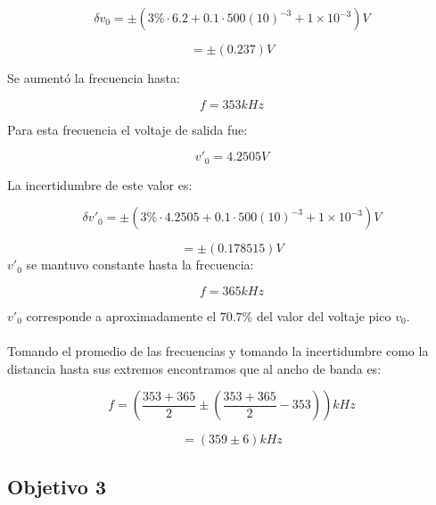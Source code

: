 \documentclass[DIV=calc, paper=a4, fontsize=11pt]{scrartcl}
\begin{document}
\begin{multicols}{2}
\begin{equation*}
    \delta v_{0}=\pm(3\%\cdot 6.2 + 0.1 \cdot 500 (10)^{-3} + 1\times10^{-3} ) V
\end{equation*}

\begin{equation*}
    =\pm( 0.237) V
\end{equation*}

Se aumentó la frecuencia hasta:

\begin{equation*}
    f= 353 kHz
\end{equation*}

Para esta frecuencia el voltaje de salida fue:

\begin{equation*}
    v'_{0} = 4.2505 V
\end{equation*}

La incertidumbre de este valor es:

\begin{equation*}
    \delta v'_{0}=\pm(3\%\cdot 4.2505 + 0.1 \cdot 500 (10)^{-3} + 1\times10^{-3} ) V
\end{equation*}

\begin{equation*}
    =\pm( 0.178515) V
\end{equation*}
$v'_{0}$ se mantuvo constante hasta la frecuencia:

\begin{equation*}
    f= 365 kHz
\end{equation*}

$v'_{0}$ corresponde a aproximadamente el $70.7\%$ del valor del voltaje pico $v_{0}$.
\\\\
Tomando el promedio de las frecuencias y tomando la incertidumbre como la distancia hasta sus extremos encontramos que al ancho de banda es:

\begin{equation*}
    f= \left(\frac{353+365}{2}\pm \left(\frac{353+365}{2}-353\right) \right) kHz
\end{equation*}

\begin{equation*}
    = (359\pm6) kHz
\end{equation*}

\subsection*{Objetivo 3}


\end{multicols}
\end{document}
